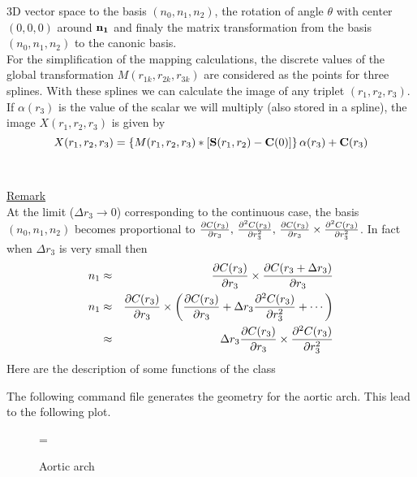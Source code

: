 \documentclass[12pt]{article}
\begin{document}
3D vector space to the basis $(n_0, n_1, n_2)$, the rotation of angle
$\theta$ with center
$(0,0,0)$ around $\bf n_1$ and finaly the matrix transformation from the
basis $(n_0, n_1, n_2)$ to the canonic basis.\\
For the simplification of the mapping calculations, the discrete values 
of the global transformation $M(r_{1k},r_{2k},r_{3k})$ are considered 
as the points for three splines. With these splines we can calculate the 
image of any triplet 
$(r_1,r_2,r_3)$. If $\alpha (r_3)$ is the value of the scalar we will multiply
(also stored in a spline), the image $X(r_1,r_2,r_3)$ is given by\\
\begin{displaymath}
X(r_1,r_2,r_3)=\left\{M(r_1,r_2,r_3)*\left[{\bf S}(r_1,r_2) - {\bf C}(0)\right]\right\}\alpha(r_3)+{\bf C}(r_3)
\end{displaymath}
\\
\\
\underline{\underline{Remark}}\\
At the limit ($\Delta r_3 \rightarrow 0$) corresponding to  the continuous case, the basis $(n_0, n_1, n_2)$ becomes proportional to ${\partial C(r_3)
\over \partial r_3},\, {\partial^2 C(r_3) \over \partial r_3^2}, \,
{\partial C(r_3) \over \partial r_3} \times {\partial^2 C(r_3) \over
\partial r_3^2}$. In fact when $\Delta r_3$ is very small then
\begin{eqnarray*}
n_1 & \approx & {\partial C(r_3) \over \partial r_3} \times {\partial C(r_3 + \Delta r_3) \over \partial r_3}\\
n_1   & \approx & {\partial C(r_3) \over \partial r_3} \times \left(
{\partial C(r_3) \over \partial r_3} + \Delta r_3 {\partial^2 C(r_3)
\over \partial r_3^2} + \cdots \right)\\
    & \approx &  \Delta r_3 {\partial C(r_3) \over \partial r_3}\times
    {\partial^2 C(r_3) \over \partial r_3^2}
\end{eqnarray*}
Here are the description of some functions of the class

The following command file generates the geometry for the aortic arch.
{\ttfamily \scriptsize
{}
\keywordstyle{\ttfamily}
\commentstyle{\ttfamily}
\stringstyle{\ttfamily}
\postlisting{\bigbreak}
}
This lead to the following plot.
\begin{figure}
\centerline{\epsfxsize=\textwidth {}}
\caption{Aortic arch}
\end{figure}
\end{document}
